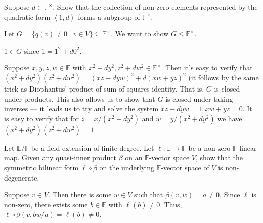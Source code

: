 \documentclass[12 pt, letterpaper]{hmcpset}
\begin{document}
\pagebreak

\begin{problem}[(5)]
	Suppose $d \in \mathbb{F}^{\times}$. Show that the collection of non-zero elements represented by the quadratic form $\left < 1, d \right >$ forms a subgroup of $\mathbb{F}^{\times}$.
\end{problem}

\begin{solution}
	Let $G = \{ q(v) \neq 0 \mid v \in V \} \subseteq \mathbb{F}^{\times}$. We want to show $G \le \mathbb{F}^{\times}$.

	$1 \in G$ since $1 = 1^{2} + d 0^{2}$. 

	Suppose $x, y, z, w \in \mathbb{F}$ with $x^{2} + d y^{2}, z^{2} + d w^{2} \in \mathbb{F}^{\times}$. Then it's easy to verify that $(x^{2} + d y^{2})(z^{2} + d w^{2}) = (xz - dyw)^{2} + d (xw + yz)^{2}$ (it follows by the same trick as Diophantus' product of sum of squares identity. That is, $G$ is closed under products. This also allows us to show that $G$ is closed under taking inverses --- it leads us to try and solve the system $xz - dyw = 1, xw + yz = 0$. It is easy to verify that for $z = x / (x^{2} + d y^{2})$ and $w = y / (x^{2} + d y^{2})$ we have $(x^{2} + d y^{2}) (z^{2} + d w^{2}) = 1$.
\end{solution}

\pagebreak

\begin{problem}[(6)]
	Let $\mathbb{E} / \mathbb{F}$ be a field extension of finite degree. Let $\ell : \mathbb{E} \to \mathbb{F}$ be a non-zero $\mathbb{F}$-linear map. Given any quasi-inner product $\beta$ on an $\mathbb{E}$-vector space $V$, show that the symmetric bilinear form $\ell \circ \beta$ on the underlying $\mathbb{F}$-vector space of $V$ is non-degenerate.
\end{problem}

\begin{solution}
	Suppose $v \in V$. Then there is some $w \in V$ such that $\beta(v, w) = a \neq 0$. Since $\ell$ is non-zero, there exists some $b \in \mathbb{E}$ with $\ell(b) \neq 0$. Thus, $\ell \circ \beta(v, bw/a) = \ell(b) \neq 0$.
\end{solution}
\end{document}
